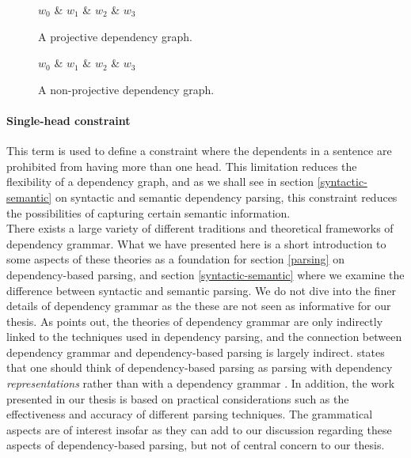 \begin{figure}
    \begin{dependency}
        \begin{deptext}[column sep=1em, row sep=.1ex]
        $w_0$ \& $w_1$ \& $w_2$ \& $w_3$ \\
        \end{deptext}
    \end{dependency}
    \caption{A projective dependency graph.}
    \label{projective}
\end{figure}

\begin{figure}
    \begin{dependency}
        \begin{deptext}[column sep=1em, row sep=.1ex]
        $w_0$ \& $w_1$ \& $w_2$ \& $w_3$ \\    
        \end{deptext}
    \end{dependency}
    \caption{A non-projective dependency graph.}
    \label{non-projective}
\end{figure}

\paragraph{Single-head constraint} This term is used to define a constraint where the dependents in a sentence are prohibited from having more than one head. This limitation reduces the flexibility of a dependency graph, and as we shall see in section \ref{syntactic-semantic} on syntactic and semantic dependency parsing, this constraint reduces the possibilities of capturing certain semantic information.\\

There exists a large variety of different traditions and theoretical frameworks of dependency grammar. What we have presented here is a short introduction to some aspects of these theories as a foundation for section \ref{parsing} on dependency-based parsing, and section \ref{syntactic-semantic} where we examine the difference between syntactic and semantic parsing. We do not dive into the finer details of dependency grammar as the these are not seen as informative for our thesis. As \citeauthor{Niv:05} points out, the theories of dependency grammar are only indirectly linked to the techniques used in dependency parsing, and the connection between dependency grammar and dependency-based parsing is largely indirect. \citeauthor{Niv:05} states that one should think of dependency-based parsing as parsing with dependency \textit{representations} rather than with a dependency grammar \cite{Niv:05}. In addition, the work presented in our thesis is based on practical considerations such as the effectiveness and accuracy of different parsing techniques. The grammatical aspects are of interest insofar as they can add to our discussion regarding these aspects of dependency-based parsing, but not of central concern to our thesis.

